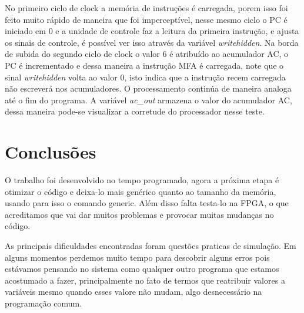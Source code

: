 \documentclass[12pt]{article}
\begin{document}
No primeiro ciclo de clock a memória de instruções é carregada, porem isso foi feito muito rápido de maneira que foi imperceptível, nesse mesmo ciclo o PC é iniciado em 0 e a unidade de controle faz a leitura da primeira instrução, e ajusta os sinais de controle, é possível ver isso através da variável \textit{writehidden}.
Na borda de subida do segundo ciclo de clock o valor 6 é atribuído ao acumulador AC, o PC é incrementado e dessa maneira a instrução MFA é carregada, note que o sinal \textit{writehidden} volta ao valor 0, isto indica que a instrução recem carregada não escreverá nos acumuladores.
O processamento continúa de maneira analoga até o fim do programa. A variável \textit{ac\_out} armazena o valor do acumulador AC, dessa maneira
 pode-se visualizar a corretude do processador nesse teste.

\section{Conclusões}

O trabalho foi desenvolvido no tempo programado, agora a próxima etapa é otimizar o código e deixa-lo mais genérico quanto ao tamanho da memória, usando para isso o comando generic. Além disso falta testa-lo na FPGA, o que acreditamos que vai dar muitos problemas e provocar muitas mudanças no código.

As principais dificuldades encontradas foram questões praticas de simulação. Em alguns momentos perdemos muito tempo para descobrir alguns erros pois estávamos pensando no sistema como qualquer outro programa que estamos acostumado a fazer, principalmente no fato de termos que reatribuir valores a variáveis mesmo quando esses valore não mudam, algo desnecessário na programação comum.



%
%
\end{document}

